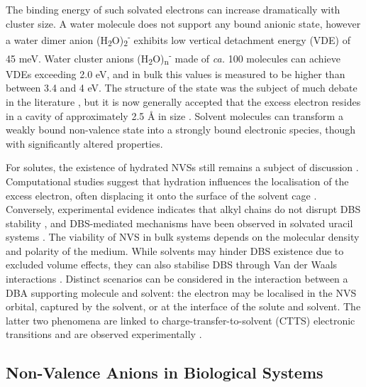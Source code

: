 The binding energy of such solvated electrons can increase dramatically with cluster size. A water molecule does not support any bound anionic state\cite{herbert2015quantum}, however a water dimer anion (H\textsubscript{2}O)\textsubscript{2}\textsuperscript{-} exhibits low vertical detachment energy (VDE) of 45 meV\cite{coe1990photoelectron}. Water cluster anions (H\textsubscript{2}O)\textsubscript{n}\textsuperscript{-} made of \emph{ca.} 100 molecules can achieve VDEs exceeding 2.0 eV\cite{verlet2005observation}, and in bulk this values is measured to be higher than between 3.4 and 4 eV\cite{coe2008photoelectron,siefermann2010binding}. The structure of the state was the subject of much debate in the literature \cite{kumar2015simple,herbert2019structure,herbert2017hydrated,kevan1981solvated}, but it is now generally accepted that the excess electron resides in a cavity of approximately 2.5 \r{A} in size \cite{herbert2019structure}. Solvent molecules can transform a weakly bound non-valence state into a strongly bound electronic species, though with significantly altered properties. 

For solutes, the existence of hydrated NVSs still remains a subject of discussion \cite{anusiewicz2020fate,castellani2019stability,larsen2010does}. Computational studies suggest that hydration influences the localisation of the excess electron, often displacing it onto the surface of the solvent cage \cite{anusiewicz2020fate}. Conversely, experimental evidence indicates that alkyl chains do not disrupt DBS stability \cite{castellani2019stability}, and DBS-mediated mechanisms have been observed in solvated uracil systems \cite{narayanan2024electron}. The viability of NVS in bulk systems depends on the molecular density and polarity of the medium. While solvents may hinder DBS existence due to excluded volume effects, they can also stabilise DBS through Van der Waals interactions \cite{bradforth2002excited,chen2000precursors}. Distinct scenarios can be considered in the interaction between a DBA supporting molecule and solvent: the electron may be localised in the NVS orbital, captured by the solvent, or at the interface of the solute and solvent. The latter two phenomena are linked to charge-transfer-to-solvent (CTTS) electronic transitions and are observed experimentally \cite{chen2000precursors,bradforth2002excited,messina2013real,carter2023birth}.

\subsection{Non-Valence Anions in Biological Systems}


